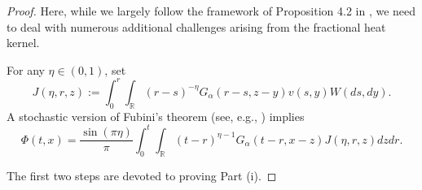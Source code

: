 \documentclass[11pt,reqno]{amsart}
\numberwithin{equation}{section}
\newcommand{\1}{{\bf 1}}
\newcommand{\2}{{\bf 2}}
\begin{document}
\begin{proof}  
Here, while we largely follow the framework of Proposition 4.2 in \cite{HW2022}, we need to deal with numerous additional challenges arising from the fractional heat kernel.
 
For any $\eta\in(0,1)$, set
 \begin{equation}\label{eq 4.12}
J(\eta,r,z):=\int_0^{r}\int_{\mathbb{R}}(r-s)^{-\eta}G_{\alpha}(r-s,z-y)v(s,y)W(ds,dy).
\end{equation}
A stochastic version of Fubini's theorem (see, e.g., \cite[Theorem 5.10]{DaPrato2014}) implies
\begin{equation}\label{eq 4.13}
\Phi(t,x)=\frac{\sin(\pi \eta)}{\pi}\int_0^{t}\int_{\mathbb{R}}(t-r)^{\eta-1}G_{\alpha}(t-r,x-z)J(\eta,r,z)dzdr.
\end{equation}

 

The first two steps are  devoted to proving Part (i).


\end{proof}
\end{document}
